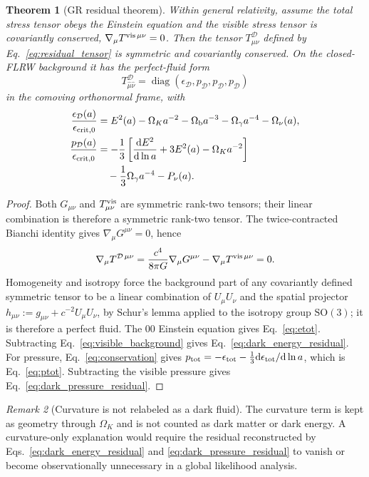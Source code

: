 \documentclass[
  aps,
  prd,
  reprint,
  superscriptaddress,
  nofootinbib,
  floatfix,
  longbibliography
]{revtex4-2}
\theoremstyle{plain}
\newtheorem{theorem}{Theorem}[section]
\theoremstyle{definition}
\theoremstyle{remark}
\newtheorem{remark}[theorem]{Remark}
\newcommand{\dd}{\mathrm d}
\newcommand{\D}{\mathcal D}
\newcommand{\crit}{\epsilon_{\mathrm{crit},0}}
\newcommand{\Omk}{\Omega_K}
\newcommand{\Ob}{\Omega_{\rm b}}
\newcommand{\Og}{\Omega_\gamma}
\newcommand{\Onu}{\Omega_\nu}
\begin{document}
\begin{theorem}[GR residual theorem]
Within general relativity, assume the total stress tensor obeys the Einstein
equation and the visible stress tensor is covariantly conserved,
$\nabla_\mu T^{{\rm vis}\,\mu\nu}=0$.  Then the tensor
$T^\D_{\mu\nu}$ defined by Eq.~\eqref{eq:residual_tensor} is symmetric and
covariantly conserved.  On the closed-FLRW background it has the perfect-fluid
form
\[
T^{\D}_{\hat\mu\hat\nu}
=\operatorname{diag}(\epsilon_{\D},p_{\D},p_{\D},p_{\D})
\]
in the comoving orthonormal frame, with
\begin{align}
\frac{\epsilon_{\D}(a)}{\crit}
&=E^2(a)-\Omk a^{-2}
-\Ob a^{-3}-\Og a^{-4}-\Onu(a),
\label{eq:dark_energy_residual}\\
\frac{p_{\D}(a)}{\crit}
&=-\frac13\left[\frac{\dd E^2}{\dd\ln a}
+3E^2(a)-\Omk a^{-2}\right]
\nonumber\\
&\quad -\frac13\Og a^{-4}-P_\nu(a).
\label{eq:dark_pressure_residual}
\end{align}
\end{theorem}

\begin{proof}
Both $G_{\mu\nu}$ and $T^{\rm vis}_{\mu\nu}$ are symmetric rank-two tensors;
their linear combination is therefore a symmetric rank-two tensor.  The
twice-contracted Bianchi identity gives $\nabla_\mu G^{\mu\nu}=0$, hence
\[
\nabla_\mu T^{\D\,\mu\nu}
=\frac{c^4}{8\pi G}\nabla_\mu G^{\mu\nu}
-\nabla_\mu T^{{\rm vis}\,\mu\nu}=0 .
\]
Homogeneity and isotropy force the background part of any covariantly defined
symmetric tensor to be a linear combination of $U_\mu U_\nu$ and the spatial
projector $h_{\mu\nu}:=g_{\mu\nu}+c^{-2}U_\mu U_\nu$, by Schur's lemma applied
to the isotropy group $\mathrm{SO}(3)$; it is therefore a perfect fluid.  The
$00$ Einstein equation gives Eq.~\eqref{eq:etot}.  Subtracting
Eq.~\eqref{eq:visible_background} gives Eq.~\eqref{eq:dark_energy_residual}.
For pressure, Eq.~\eqref{eq:conservation} gives
$p_{\rm tot}=-\epsilon_{\rm tot}
-\frac13\dd\epsilon_{\rm tot}/\dd\ln a$, which is Eq.~\eqref{eq:ptot}.
Subtracting the visible pressure gives Eq.~\eqref{eq:dark_pressure_residual}.
\end{proof}

\begin{remark}[Curvature is not relabeled as a dark fluid]
The curvature term is kept as geometry through $\Omega_K$ and is not counted as
dark matter or dark energy.  A curvature-only explanation would require the
residual reconstructed by Eqs.~\eqref{eq:dark_energy_residual} and
\eqref{eq:dark_pressure_residual} to vanish or become observationally
unnecessary in a global likelihood analysis.
\end{remark}
\end{document}
